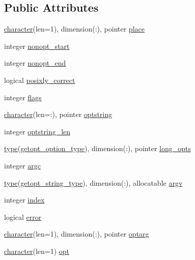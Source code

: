 \subsection*{Public Attributes}
\begin{DoxyCompactItemize}
\item 
\hyperlink{option__stopwatch_83_8txt_abd4b21fbbd175834027b5224bfe97e66}{character}(len=1), dimension(\+:), pointer \hyperlink{structm__getopt__long_1_1getopt__type_af6fd8876c9c6d9cc3fd138f82034b6b0}{place}
\item 
integer \hyperlink{structm__getopt__long_1_1getopt__type_a93269336dc54e0fda8a97ee526dec41d}{nonopt\+\_\+start}
\item 
integer \hyperlink{structm__getopt__long_1_1getopt__type_a2ef4d150aa06038a08470b7136e37b20}{nonopt\+\_\+end}
\item 
logical \hyperlink{structm__getopt__long_1_1getopt__type_a8d4f22423343ddddac8ad75e8c5e35a3}{posixly\+\_\+correct}
\item 
integer \hyperlink{structm__getopt__long_1_1getopt__type_a6fd202cf7a7c598300cce43ac7b521f7}{flags}
\item 
\hyperlink{option__stopwatch_83_8txt_abd4b21fbbd175834027b5224bfe97e66}{character}(len=\+:), pointer \hyperlink{structm__getopt__long_1_1getopt__type_a12683592006aebcc95aac78a8c399601}{optstring}
\item 
integer \hyperlink{structm__getopt__long_1_1getopt__type_a02e7f4b1bfd46652224cf691e097afcf}{optstring\+\_\+len}
\item 
\hyperlink{stop__watch_83_8txt_a70f0ead91c32e25323c03265aa302c1c}{type}(\hyperlink{structm__getopt__long_1_1getopt__option__type}{getopt\+\_\+option\+\_\+type}), dimension(\+:), pointer \hyperlink{structm__getopt__long_1_1getopt__type_a8de5191497ca7e50e4fbd7a28a306b10}{long\+\_\+opts}
\item 
integer \hyperlink{structm__getopt__long_1_1getopt__type_a91780331d8db9ac26256228dded982e8}{argc}
\item 
\hyperlink{stop__watch_83_8txt_a70f0ead91c32e25323c03265aa302c1c}{type}(\hyperlink{structm__getopt__long_1_1getopt__string__type}{getopt\+\_\+string\+\_\+type}), dimension(\+:), allocatable \hyperlink{structm__getopt__long_1_1getopt__type_a4210844e9676acb71fe72b0d684d7b67}{argv}
\item 
integer \hyperlink{structm__getopt__long_1_1getopt__type_a02b3dc6e47301677812cad9a6160033e}{index}
\item 
logical \hyperlink{structm__getopt__long_1_1getopt__type_a4558004f007b7c97ded6b52c27e0a383}{error}
\item 
\hyperlink{option__stopwatch_83_8txt_abd4b21fbbd175834027b5224bfe97e66}{character}(len=1), dimension(\+:), pointer \hyperlink{structm__getopt__long_1_1getopt__type_a13987d3bac45e87c5102ebdfdc433aef}{optarg}
\item 
\hyperlink{option__stopwatch_83_8txt_abd4b21fbbd175834027b5224bfe97e66}{character}(len=1) \hyperlink{structm__getopt__long_1_1getopt__type_a4cba432279aa63b2154dba752caedd31}{opt}
\end{DoxyCompactItemize}


